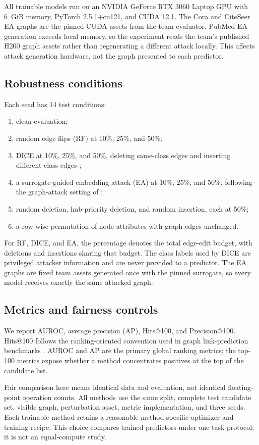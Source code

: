 \documentclass[11pt]{article}
\begin{document}
All trainable models run on an NVIDIA GeForce RTX 3060 Laptop GPU with 6~GiB
memory, PyTorch 2.5.1+cu121, and CUDA 12.1. The Cora and CiteSeer EA graphs are
the pinned CUDA assets from the team evaluator. PubMed EA generation exceeds
local memory, so the experiment reads the team's published H200 graph assets
rather than regenerating a different attack locally. This affects attack
generation hardware, not the graph presented to each predictor.

\subsection{Robustness conditions}
Each seed has 14 test conditions:
\begin{enumerate}
  \item clean evaluation;
  \item random edge flips (RF) at 10\%, 25\%, and 50\%;
  \item DICE at 10\%, 25\%, and 50\%, deleting same-class edges and inserting
        different-class edges \citep{waniek2018hiding};
  \item a surrogate-guided embedding attack (EA) at 10\%, 25\%, and 50\%,
        following the graph-attack setting of \citet{zugner2019meta};
  \item random deletion, hub-priority deletion, and random insertion, each at
        50\%;
  \item a row-wise permutation of node attributes with graph edges unchanged.
\end{enumerate}
For RF, DICE, and EA, the percentage denotes the total edge-edit budget, with
deletions and insertions sharing that budget. The class labels used by DICE
are privileged attacker information and are never provided to a predictor.
The EA graphs are fixed team assets generated once with the pinned surrogate,
so every model receives exactly the same attacked graph.

\subsection{Metrics and fairness controls}
We report AUROC, average precision (AP), Hits@100, and Precision@100. Hits@100
follows the ranking-oriented convention used in graph link-prediction
benchmarks \citep{hu2020ogb}. AUROC and AP are the primary global ranking
metrics; the top-100 metrics expose whether a method concentrates positives at
the top of the candidate list.

Fair comparison here means identical data and evaluation, not identical
floating-point operation counts. All methods use the same split, complete
test candidate set, visible graph, perturbation asset, metric implementation,
and three seeds. Each trainable method retains a reasonable method-specific
optimizer and training recipe. This choice compares trained predictors under
one task protocol; it is not an equal-compute study.
\end{document}
